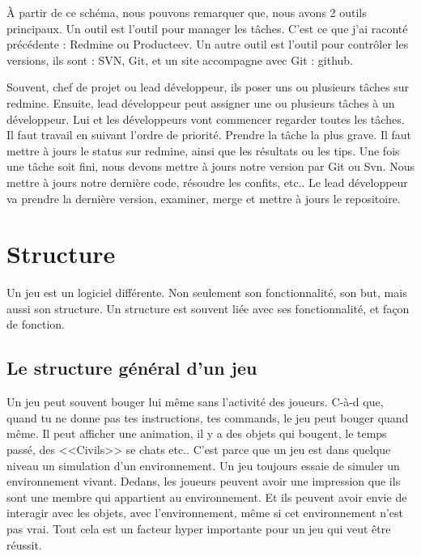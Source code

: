 
À partir de ce schéma, nous pouvons remarquer que, nous avons 2 outils principaux. Un outil est l'outil pour manager les tâches. C'est ce que j'ai raconté précédente : Redmine ou Producteev. Un autre outil est l'outil pour contrôler les versions, ils sont : SVN, Git, et un site accompagne avec Git : github. 

Souvent, chef de projet ou lead développeur, ils poser uns ou plusieurs tâches sur redmine. Ensuite, lead développeur peut assigner une ou plusieurs tâches à un développeur. Lui et les développeurs vont commencer regarder toutes les tâches. Il faut travail en suivant l'ordre de priorité. Prendre la tâche la plus grave. Il faut mettre à jours le status sur redmine, ainsi que les résultats ou les tips. Une fois une tâche soit fini, nous devons mettre à jours notre version par Git ou Svn. Nous mettre à jours notre dernière code, résoudre les confits, etc.. Le lead développeur va prendre la dernière version, examiner, merge et mettre à jours le repositoire.




\section{Structure} %
\label{sec:structure}

Un jeu est un logiciel différente. Non seulement son fonctionnalité, son but, mais aussi son structure. Un structure est souvent liée avec ses fonctionnalité, et façon de fonction. 

\subsection{Le structure général d'un jeu} %
\label{sub:le_structure_général_d_un_jeu}

Un jeu peut souvent bouger lui même sans l'activité des joueurs. C-à-d que, quand tu ne donne pas tes instructions, tes commands, le jeu peut bouger quand même. Il peut afficher une animation, il y a des objets qui bougent, le temps passé, des <<Civils>> se chats etc.. C'est parce que un jeu est dans quelque niveau un simulation d'un environnement. Un jeu toujours essaie de simuler un environnement vivant. Dedans, les joueurs peuvent avoir une impression que ils sont une membre qui appartient au environnement. Et ils peuvent avoir envie de interagir avec les objets, avec l'environnement, même si cet environnement n'est pas vrai. Tout cela est un facteur hyper importante pour un jeu qui veut être réussit.

